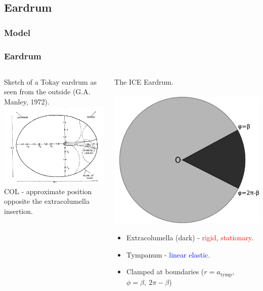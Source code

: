 \documentclass{beamer}
\begin{document}
\subsection{Eardrum}
\subsubsection{Model}
\begin{frame}[t]
\frametitle{Eardrum}
\begin{columns}
    \begin{column}{0.5\textwidth}
      \centering
      \small
      Sketch of a Tokay eardrum as seen from the outside (G.A. Manley, 1972).\\
      \includegraphics[width = 3.7 cm]{Diagrams/geckoear.png}\\
      \small
     COL - approximate position opposite the extracolumella insertion.
    \end{column}

    \begin{column}{0.5\textwidth}
      \centering
      \small
      The ICE Eardrum.\\
      \textbf{}\\
      \includegraphics[width = 3.2 cm]{Diagrams/tympanummodel.png}\\
\small
\begin{itemize}
      \item[] Extracolumella (dark) - \textcolor{red}{rigid}, \textcolor{red}{stationary}.
      \item[] Tympanum - \textcolor{blue}{linear elastic}.
      \item[] Clamped at boundaries ($r=a_{\mathrm{tymp}}$, $\phi=\beta,\ 2\pi-\beta$)
\end{itemize}

    \end{column}
  \end{columns}
  
\end{frame}
\end{document}
